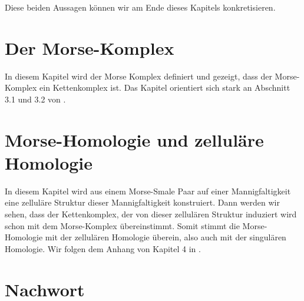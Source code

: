 \documentclass[a4paper,11pt,twoside]{scrreport}
\begin{document}
Diese beiden Aussagen können wir am Ende dieses Kapitels konkretisieren.







\begingroup
\let\clearpage\relax
\chapter{Der Morse-Komplex}
\endgroup

In diesem Kapitel wird der Morse Komplex definiert und gezeigt, dass der 
Morse-Komplex ein Kettenkomplex ist. Das Kapitel orientiert sich stark an Abschnitt 3.1 und 3.2 von 
\cite{audin}.




\begingroup
\let\clearpage\relax
\chapter{Morse-Homologie und zelluläre Homologie}
\endgroup

In diesem Kapitel wird aus einem Morse-Smale Paar auf einer Mannigfaltigkeit
eine zelluläre Struktur dieser Mannigfaltigkeit konstruiert. Dann werden wir 
sehen, dass der Kettenkomplex, der von dieser zellulären Struktur induziert wird schon mit
dem Morse-Komplex übereinstimmt. Somit stimmt die Morse-Homologie mit der 
zellulären Homologie überein, also auch mit der singulären Homologie.
Wir folgen dem Anhang von Kapitel 4 in \cite{audin}.






\begingroup
\let\clearpage\relax
\chapter*{Nachwort}
\endgroup
\end{document}
